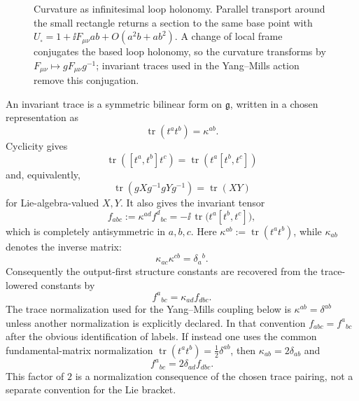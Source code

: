 \begin{figure}[H]
{
  }
  \caption{Curvature as infinitesimal loop holonomy.  Parallel transport around
  the small rectangle returns a section to the same base point with
  \(U_\square=1+\ii F_{\mu\nu}ab+O(a^2b+ab^2)\).  A change of local frame
  conjugates the based loop holonomy, so the curvature transforms by
  \(F_{\mu\nu}\mapsto gF_{\mu\nu}g^{-1}\); invariant traces used in the
  Yang--Mills action remove this conjugation.}
  \label{fig:ym-curvature-action-chain}
\end{figure}

An invariant trace is a symmetric bilinear form on \(\mathfrak g\), written in
a chosen representation as
\begin{equation}
  \operatorname{tr}(t^a t^b)=\kappa^{ab}.
  \label{eq:ym-trace-kappa}
\end{equation}
Cyclicity gives
\[
  \operatorname{tr}([t^a,t^b]t^c)
  =
  \operatorname{tr}(t^a[t^b,t^c])
\]
and, equivalently,
\[
  \operatorname{tr}(gXg^{-1}gYg^{-1})
  =
  \operatorname{tr}(XY)
\]
for Lie-algebra-valued \(X,Y\).  It also gives the invariant tensor
\begin{equation}
  f_{abc}:=\kappa^{ad}f^d{}_{bc}
  =
  -\ii\,\operatorname{tr}\bigl(t^a[t^b,t^c]\bigr),
  \label{eq:ym-fabc-lowered}
\end{equation}
which is completely antisymmetric in \(a,b,c\).  Here
\(\kappa^{ab}:=\operatorname{tr}(t^a t^b)\), while \(\kappa_{ab}\) denotes the
inverse matrix:
\begin{equation}
  \kappa_{ac}\kappa^{cb}=\delta_a{}^b .
  \label{eq:ym-kappa-inverse}
\end{equation}
Consequently the output-first structure constants are recovered from the
trace-lowered constants by
\begin{equation}
  f^a{}_{bc}=\kappa_{ad}f_{dbc}.
  \label{eq:ym-structure-constant-raising}
\end{equation}
The trace normalization used for the Yang--Mills coupling below is
\(\kappa^{ab}=\delta^{ab}\) unless another normalization is explicitly
declared.  In that convention \(f_{abc}=f^a{}_{bc}\) after the obvious
identification of labels.  If instead one uses the common fundamental-matrix
normalization \(\operatorname{tr}(t^a t^b)=\frac12\delta^{ab}\), then
\(\kappa_{ab}=2\delta_{ab}\) and
\[
  f^a{}_{bc}=2\delta_{ad}f_{dbc}.
\]
This factor of \(2\) is a normalization consequence of the chosen trace pairing,
not a separate convention for the Lie bracket.

